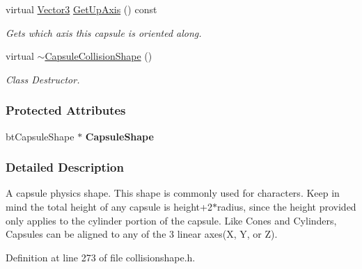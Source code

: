 \begin{DoxyCompactItemize}
\item 
virtual \hyperlink{classphys_1_1Vector3}{Vector3} \hyperlink{classphys_1_1CapsuleCollisionShape_acde6b2a8631eecf06d1eff38e88fb734}{GetUpAxis} () const 
\begin{DoxyCompactList}\small\item\em Gets which axis this capsule is oriented along. \item\end{DoxyCompactList}\item 
\hypertarget{classphys_1_1CapsuleCollisionShape_ab621241d99ff8037fc5b81f275823d01}{
virtual \hyperlink{classphys_1_1CapsuleCollisionShape_ab621241d99ff8037fc5b81f275823d01}{$\sim$CapsuleCollisionShape} ()}
\label{classphys_1_1CapsuleCollisionShape_ab621241d99ff8037fc5b81f275823d01}

\begin{DoxyCompactList}\small\item\em Class Destructor. \item\end{DoxyCompactList}\end{DoxyCompactItemize}
\subsubsection*{Protected Attributes}
\begin{DoxyCompactItemize}
\item 
\hypertarget{classphys_1_1CapsuleCollisionShape_a16d71b1df42bd3ed59673c68ffd56fb7}{
btCapsuleShape $\ast$ {\bfseries CapsuleShape}}
\label{classphys_1_1CapsuleCollisionShape_a16d71b1df42bd3ed59673c68ffd56fb7}

\end{DoxyCompactItemize}


\subsubsection{Detailed Description}
A capsule physics shape. This shape is commonly used for characters. Keep in mind the total height of any capsule is height+2$\ast$radius, since the height provided only applies to the cylinder portion of the capsule. Like Cones and Cylinders, Capsules can be aligned to any of the 3 linear axes(X, Y, or Z). 

Definition at line 273 of file collisionshape.h.



